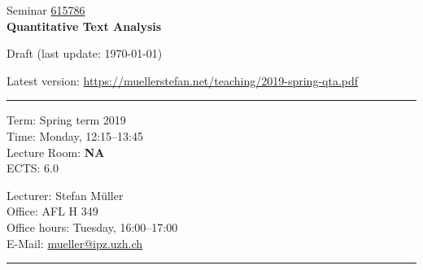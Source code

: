 \documentclass[abstract=on,parskip=full,headings=standardclasses,fontsize=11pt,paper=a4]{scrartcl}
\begin{document}
	
\singlespacing

\noindent
{}%
\hfill%

\singlespacing
\vspace{1cm}

\begin{center}
{\large Seminar \href{https://studentservices.uzh.ch/uzh/anonym/vvz/index.html#/details/2018/004/SM/50926554}{615786}} \\ 
\medskip
{\Large \textbf{Quantitative Text Analysis}} 
\bigskip


{\large  {Draft (last update: \today)}}\\
\bigskip

Latest version: \url{https://muellerstefan.net/teaching/2019-spring-qta.pdf}
\end{center}

\vspace{1.5cm}

\hrule
\medskip
\begin{minipage}[t]{0.5\textwidth}
Term: Spring term 2019 \\
Time: Monday, 12:15--13:45 \\
Lecture Room: \textbf{NA} \\
ECTS: 6.0
\end{minipage}
\begin{minipage}[t]{0.49\textwidth}
\begin{flushright}
Lecturer: Stefan Müller \\
Office:  AFL H 349\\
Office hours: Tuesday, 16:00--17:00 \\
E-Mail: \textsf{\href{mailto:mueller@ipz.uzh.ch}{mueller@ipz.uzh.ch}}
\end{flushright}
\end{minipage}
\medskip
\vspace{2.5mm}
\hrule 
\end{document}
